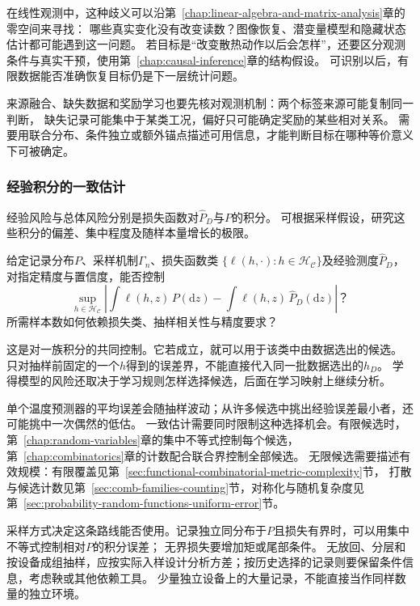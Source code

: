 在线性观测中，这种歧义可以沿第~\ref{chap:linear-algebra-and-matrix-analysis}章的零空间来寻找：
哪些真实变化没有改变读数？图像恢复、潜变量模型和隐藏状态估计都可能遇到这一问题。
若目标是“改变散热动作以后会怎样”，还要区分观测条件与真实干预，使用第~\ref{chap:causal-inference}章的结构假设。
可识别以后，有限数据能否准确恢复目标仍是下一层统计问题。

来源融合、缺失数据和奖励学习也要先核对观测机制：两个标签来源可能复制同一判断，
缺失记录可能集中于某类工况，偏好只可能确定奖励的某些相对关系。
需要用联合分布、条件独立或额外锚点描述可用信息，才能判断目标在哪种等价意义下可被确定。

\subsubsection{经验积分的一致估计}
\label{sec:future-analysis-generalization}

经验风险与总体风险分别是损失函数对$\widehat P_D$与$P$的积分。
可根据采样假设，研究这些积分的偏差、集中程度及随样本量增长的极限。

\begin{mathproblem}[有限观测对总体泛函的近似]
  \label{question:future-generalization}
  给定记录分布$P$、采样机制$\Gamma_n$、损失函数类
  $\{\ell(h,\cdot):h\in\mathcal H_{\mathcal C}\}$及经验测度$\widehat P_D$，
  对指定精度与置信度，能否控制
  \[
    \sup_{h\in\mathcal H_{\mathcal C}}
      \left|\int\ell(h,z)\,P(\mathrm dz)
      -\int\ell(h,z)\,\widehat P_D(\mathrm dz)\right|\text{？}
  \]
  所需样本数如何依赖损失类、抽样相关性与精度要求？
\end{mathproblem}

这是对一族积分的共同控制。它若成立，就可以用于该类中由数据选出的候选。
只对抽样前固定的一个$h$得到的误差界，不能直接代入同一批数据选出的$h_D$。
学得模型的风险还取决于学习规则怎样选择候选，后面在学习映射上继续分析。

单个温度预测器的平均误差会随抽样波动；从许多候选中挑出经验误差最小者，还可能挑中一次偶然的低估。
一致估计需要同时限制这种选择机会。有限候选时，第~\ref{chap:random-variables}章的集中不等式控制每个候选，
第~\ref{chap:combinatorics}章的计数配合联合界控制全部候选。
无限候选需要描述有效规模：有限覆盖见第~\ref{sec:functional-combinatorial-metric-complexity}节，
打散与候选计数见第~\ref{sec:comb-families-counting}节，对称化与随机复杂度见第~\ref{sec:probability-random-functions-uniform-error}节。

采样方式决定这条路线能否使用。记录独立同分布于$P$且损失有界时，可以用集中不等式控制相对$P$的积分误差；
无界损失要增加矩或尾部条件。
无放回、分层和按设备成组抽样，应按实际入样设计分析方差；按历史选择的记录则要保留条件信息，考虑鞅或其他依赖工具。
少量独立设备上的大量记录，不能直接当作同样数量的独立环境。

